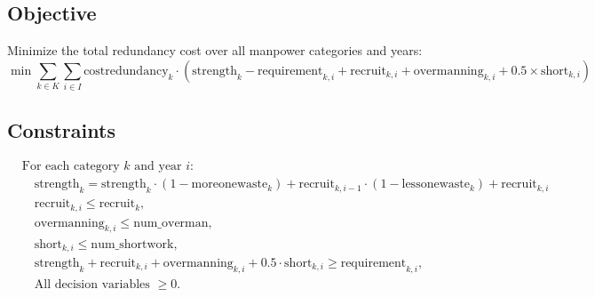 \documentclass{article}
\begin{document}
\subsection*{Objective}
Minimize the total redundancy cost over all manpower categories and years:
\[
\min \sum_{k \in K} \sum_{i \in I} \text{costredundancy}_{k} \cdot (\text{strength}_{k} - \text{requirement}_{k, i} + \text{recruit}_{k, i} + \text{overmanning}_{k, i} + 0.5 \times \text{short}_{k, i})
\]

\subsection*{Constraints}
\begin{align*}
    & \text{For each category } k \text{ and year } i: \\
    & \quad \text{strength}_{k} = \text{strength}_{k} \cdot (1 - \text{moreonewaste}_{k}) + \text{recruit}_{k, i-1} \cdot (1 - \text{lessonewaste}_{k}) + \text{recruit}_{k, i} \\
    & \quad \text{recruit}_{k, i} \leq \text{recruit}_{k}, \\
    & \quad \text{overmanning}_{k, i} \leq \text{num\_overman}, \\
    & \quad \text{short}_{k, i} \leq \text{num\_shortwork}, \\
    & \quad \text{strength}_{k} + \text{recruit}_{k, i} + \text{overmanning}_{k, i} + 0.5 \cdot \text{short}_{k, i} \geq \text{requirement}_{k, i}, \\
    & \quad \text{All decision variables } \geq 0.
\end{align*}
\end{document}
